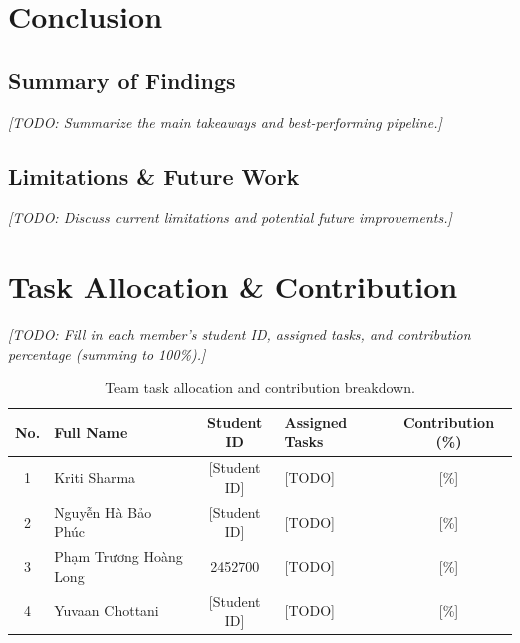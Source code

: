 \documentclass[11pt,a4paper]{article}
\renewcommand{\arraystretch}{1.15}
\begin{document}
\section{Conclusion}
\subsection{Summary of Findings}
\par\noindent\textit{[TODO: Summarize the main takeaways and best-performing pipeline.]}

\subsection{Limitations \& Future Work}
\par\noindent\textit{[TODO: Discuss current limitations and potential future improvements.]}

\section{Task Allocation \& Contribution}
\par\noindent\textit{[TODO: Fill in each member's student ID, assigned tasks, and contribution percentage (summing to 100\%).]}

\begin{table}[H]
\centering
\small
\renewcommand{\arraystretch}{1.35}
\begin{tabularx}{\linewidth}{@{}c p{3.8cm} c X c@{}}
\toprule
\textbf{No.} & \textbf{Full Name} & \textbf{Student ID} & \textbf{Assigned Tasks} & \textbf{Contribution (\%)}\\
\midrule
1 & Kriti Sharma & {[Student ID]} & {[TODO]} & {[\%]} \\
2 & Nguyễn Hà Bảo Phúc & {[Student ID]} & {[TODO]} & {[\%]} \\
3 & Phạm Trương Hoàng Long & 2452700 & {[TODO]} & {[\%]} \\
4 & Yuvaan Chottani & {[Student ID]} & {[TODO]} & {[\%]} \\
\bottomrule
\end{tabularx}
\caption{Team task allocation and contribution breakdown.}
\end{table}
\end{document}
